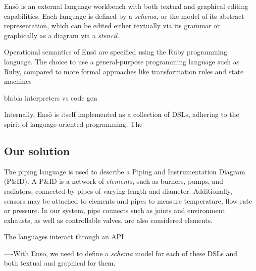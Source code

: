\documentclass[11pt]{article}
\def\Enso{Ens\={o}\xspace}
\begin{document}
\Enso is an external language workbench with both textual and graphical editing capabilities. Each language is defined by a \emph{schema}, or the model of its abstract representation, which can be edited either textually via its grammar or graphically as a diagram via a \emph{stencil}.

Operational semantics of \Enso are specified using the Ruby programming language. The choice to use a general-purpose programming language such as Ruby, compared to more formal approaches like transformation rules and state machines

blabla interpreters vs code gen

\comments{

}



Internally, \Enso is itself implemented as a collection of DSLs, adhering to the spirit of language-oriented programming. The 


\subsection{Our solution}

The piping language is used to describe a Piping and Instrumentation Diagram (P&ID). A P&ID is a network of \emph{elements}, such as burners, pumps, and radiators, connected by pipes of varying length and diameter. Additionally, sensors may be attached to elements and pipes to measure temperature, flow rate or pressure. In our system, pipe connects such as joints and environment exhausts, as well as controllable valves, are also considered elements.

The languages interact through an API 

----With \Enso, we need to define a \emph{schema} model for each of these DSLs and both textual and graphical for them.
\end{document}
